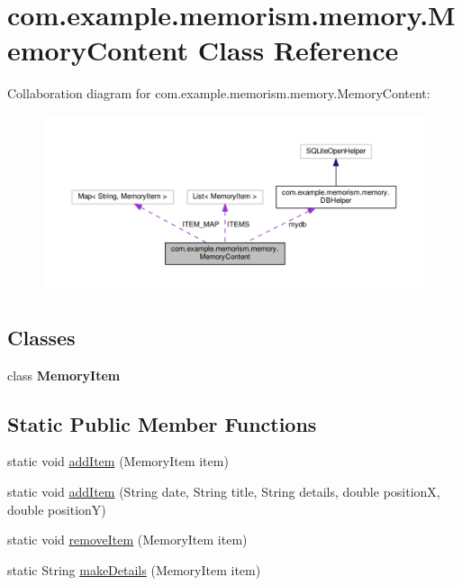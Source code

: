 \hypertarget{classcom_1_1example_1_1memorism_1_1memory_1_1_memory_content}{}\section{com.\+example.\+memorism.\+memory.\+Memory\+Content Class Reference}
\label{classcom_1_1example_1_1memorism_1_1memory_1_1_memory_content}


Collaboration diagram for com.\+example.\+memorism.\+memory.\+Memory\+Content\+:
\nopagebreak
\begin{figure}[H]
\begin{center}
\leavevmode
\includegraphics[width=350pt]{d6/d06/classcom_1_1example_1_1memorism_1_1memory_1_1_memory_content__coll__graph}
\end{center}
\end{figure}
\subsection*{Classes}
\begin{DoxyCompactItemize}
\item 
class {\bfseries Memory\+Item}
\end{DoxyCompactItemize}
\subsection*{Static Public Member Functions}
\begin{DoxyCompactItemize}
\item 
static void \hyperlink{classcom_1_1example_1_1memorism_1_1memory_1_1_memory_content_aa4de84ed8cc74b2a05eee78be9006beb}{add\+Item} (Memory\+Item item)
\item 
static void \hyperlink{classcom_1_1example_1_1memorism_1_1memory_1_1_memory_content_ad11677d76710e08a859b0ec18fd42fd7}{add\+Item} (String date, String title, String details, double positionX, double positionY)
\item 
static void \hyperlink{classcom_1_1example_1_1memorism_1_1memory_1_1_memory_content_a0712c96d927ddb6c68202f9ea24bea5c}{remove\+Item} (Memory\+Item item)
\item 
static String \hyperlink{classcom_1_1example_1_1memorism_1_1memory_1_1_memory_content_a4e7cf028fd6d81395968bc10f42a7643}{make\+Details} (Memory\+Item item)
\end{DoxyCompactItemize}
